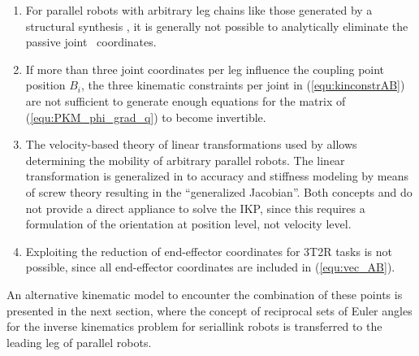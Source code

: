 \documentclass[robotics,article,accept,moreauthors,pdftex]{Definitions/mdpi}
\newcommand{\bm}[1]{\boldsymbol{#1}}
\let\Phi\varPhi
\begin{document}
\begin{enumerate}
    \item For parallel robots with arbitrary leg chains like those generated by a structural \linebreak synthesis \cite{KongGos2005, Gogu2008, RamirezKotOrt2015}, it is generally not possible to analytically eliminate the passive joint~ coordinates.
    \item If more than three joint coordinates per leg influence the coupling point position $B_i$, the three kinematic constraints per joint in (\ref{equ:kinconstrAB}) are not sufficient to generate enough equations for the matrix of (\ref{equ:PKM_phi_grad_q}) to become invertible.
    \item The velocity-based theory of linear transformations used by \cite{Gogu2008} allows determining the mobility of arbitrary parallel robots.
    The linear transformation is generalized in \cite{HuangLiuChe2011} to accuracy and stiffness modeling by means of screw theory resulting in the ``generalized Jacobian''.
    Both concepts  and do not provide a direct appliance to solve the IKP, since this requires a formulation of the orientation at position level, not velocity level.
    \item Exploiting the reduction of end-effector coordinates for 3T2R tasks is not possible, since all end-effector coordinates are included in (\ref{equ:vec_AB}).
\end{enumerate}
%

An alternative kinematic model to encounter the combination of these points is presented in the next section, where the concept of reciprocal sets of Euler angles for the inverse kinematics problem for serial\replaced[id=Sp]{-}{ }link robots \cite{1_SchapplerTapOrt2019} is transferred to the leading leg of parallel robots.

%
\end{document}
